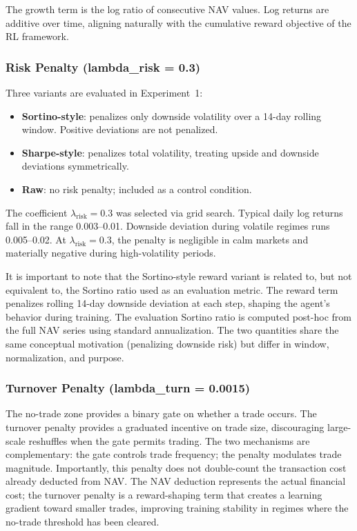 \documentclass[pdflatex,sn-mathphys-num]{sn-jnl}
\begin{document}
The growth term is the log ratio of consecutive NAV values. Log returns
are additive over time, aligning naturally with the cumulative reward
objective of the RL framework.

\subsubsection{Risk Penalty (lambda\_risk = 0.3)}

Three variants are evaluated in Experiment~1:

\begin{itemize}[leftmargin=*]
\item \textbf{Sortino-style}: penalizes only downside volatility over a 14-day rolling window. Positive deviations are not penalized.
\item \textbf{Sharpe-style}: penalizes total volatility, treating upside and downside deviations symmetrically.
\item \textbf{Raw}: no risk penalty; included as a control condition.
\end{itemize}

The coefficient $\lambda_{\mathrm{risk}} = 0.3$ was selected via grid search.
Typical daily log returns fall in the range 0.003--0.01. Downside deviation
during volatile regimes runs 0.005--0.02. At $\lambda_{\mathrm{risk}} = 0.3$,
the penalty is negligible in calm markets and materially negative during
high-volatility periods.

It is important to note that the Sortino-style reward variant is related to,
but not equivalent to, the Sortino ratio used as an evaluation metric.
The reward term penalizes rolling 14-day downside deviation at each step,
shaping the agent's behavior during training. The evaluation Sortino ratio
is computed post-hoc from the full NAV series using standard annualization.
The two quantities share the same conceptual motivation (penalizing downside
risk) but differ in window, normalization, and purpose.

\subsubsection{Turnover Penalty (lambda\_turn = 0.0015)}

The no-trade zone provides a binary gate on whether a trade occurs. The
turnover penalty provides a graduated incentive on trade size, discouraging
large-scale reshuffles when the gate permits trading. The two mechanisms are
complementary: the gate controls trade frequency; the penalty modulates trade
magnitude. Importantly, this penalty does not double-count the transaction cost
already deducted from NAV. The NAV deduction represents the actual financial
cost; the turnover penalty is a reward-shaping term that creates a learning
gradient toward smaller trades, improving training stability in regimes where
the no-trade threshold has been cleared.
\end{document}

